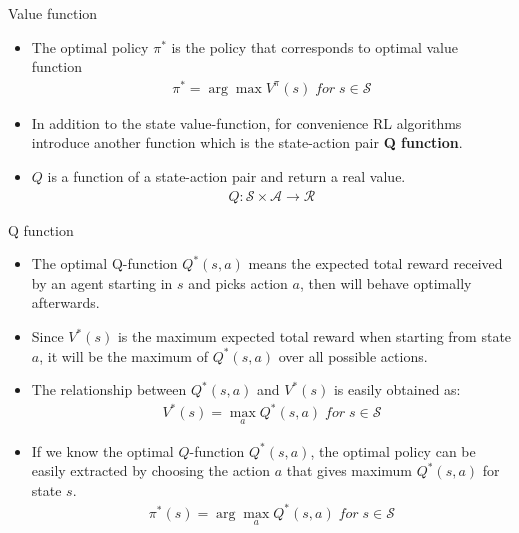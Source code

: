 \documentclass[10pt,mathserif]{beamer}
\begin{document}
\begin{frame}{Value function}
\begin{itemize}
\item The optimal policy $\pi^*$ is the policy that corresponds to optimal value function
\begin{align}
\pi^* = \arg\max V^{\pi}(s) \; for \; s\in\mathcal{S}
\end{align}
\item In addition to the state value-function, for convenience RL algorithms introduce another function which is the
state-action pair \textbf{Q function}.
\item $Q$ is a function of a state-action pair and return a real value.
\begin{align}
Q : \mathcal{S} \times \mathcal{A} \rightarrow \mathcal{R}
\end{align}
\end{itemize}
\end{frame}

\begin{frame}{Q function}
\begin{itemize}
\item The optimal Q-function $Q^*(s,a)$ means the expected total reward received by an agent starting in $s$ and picks action $a$, then will behave optimally afterwards.
\item Since $V^*(s)$ is the maximum expected total reward when starting from state $a$, it will be the maximum of $Q^*(s,a)$ over all possible actions.
\item The relationship between $Q^*(s,a)$ and $V^*(s)$ is easily obtained as:
\begin{align}
V^*(s) = \max_a Q^*(s,a) \; for \; s\in\mathcal{S}
\end{align}
\item If we know the optimal $Q$-function $Q^*(s,a)$, the optimal policy can be easily extracted by choosing the action $a$ that gives maximum $Q^*(s,a)$ for state $s$.
\begin{align}
\pi^*(s) = \arg \max_aQ^*(s,a) \; for \; s\in\mathcal{S}
\end{align}
\end{itemize}
\end{frame}
\end{document}

